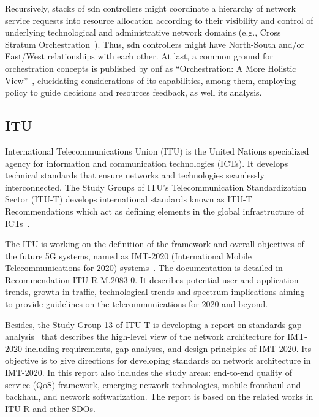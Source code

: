 Recursively, stacks of \gls{sdn} controllers might coordinate a hierarchy of network service requests into resource allocation according to their visibility and control of underlying technological and administrative network domains (e.g., Cross Stratum Orchestration~\cite{ONF:CSO:2017}). Thus, \gls{sdn} controllers might have North-South and/or East/West relationships with each other. At last, a common ground for orchestration concepts is published by \gls{onf} as ``Orchestration: A More Holistic View''~\cite{ONF:Orch:2017}, elucidating considerations of its capabilities, among them, employing policy to guide decisions and resources feedback, as well its analysis.  


\subsection {ITU}
International Telecommunications Union (ITU) is the United Nations specialized agency for information and communication technologies (ICTs). It develops technical standards that ensure networks and technologies seamlessly interconnected. The Study Groups of ITU’s Telecommunication Standardization Sector (ITU-T) develops international standards known as ITU-T Recommendations which act as defining elements in the global infrastructure of ICTs~\cite{ITUITU:World}.

The ITU is working on the definition of the framework and overall objectives of the future 5G systems, named as IMT-2020 (International Mobile Telecommunications for 2020) systems~\cite{ITU-R2015RecommendationBeyond}. The documentation is detailed in Recommendation ITU-R M.2083-0. It describes potential user and application trends, growth in traffic, technological trends and spectrum implications aiming to provide guidelines on the telecommunications for 2020 and beyond.

Besides, the Study Group 13 of ITU-T is developing a report on standards gap analysis~\cite{ITU-T2015FGAnalysis} that describes the high-level view of the network architecture for IMT-2020 including requirements, gap analyses, and design principles of IMT-2020. Its objective is to give directions for developing standards on network architecture in IMT-2020. In this report also includes the study areas:  end-to-end quality of service (QoS) framework, emerging network technologies, mobile fronthaul and backhaul, and network softwarization. The report is based on the related works in ITU-R and other SDOs.

 
